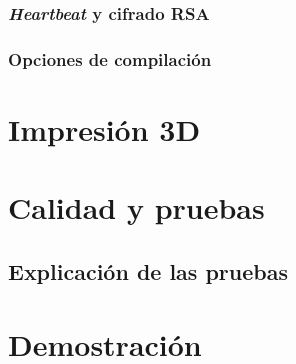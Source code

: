\subsection{\textit{Heartbeat} y cifrado RSA}

\subsection{Opciones de compilación}


\chapter{Impresión 3D}

% 
% 
% 

\chapter{Calidad y pruebas}

% 
\section{Explicación de las pruebas}

%
%

\chapter{Demostración}

